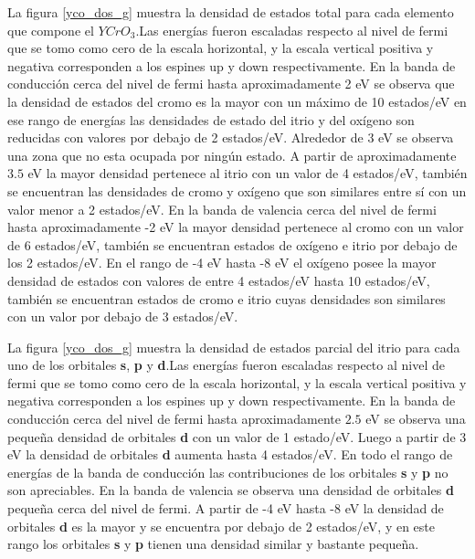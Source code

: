 La figura \ref{yco_dos_g}  muestra la densidad de estados 
total para 
cada 
elemento que compone el $YCrO_{3}$.Las energ\'ias fueron escaladas 
respecto al 
nivel de fermi que se tomo como cero de la escala horizontal, y la 
escala 
vertical positiva y negativa corresponden a los espines up y down 
respectivamente. En la banda de conducci\'on cerca del nivel de fermi 
hasta aproximadamente 2 eV se observa que la densidad de estados del 
cromo es la mayor con un m\'aximo de 10 estados/eV en ese rango de 
energ\'ias las densidades de estado del itrio y del ox\'igeno son 
reducidas con valores por debajo de 2 estados/eV. Alrededor de 3 eV se 
observa una zona que no esta ocupada por ning\'un estado. A partir de 
aproximadamente $3.5$ eV la mayor densidad pertenece al itrio con un 
valor de 4 estados/eV, tambi\'en se encuentran las densidades de cromo 
y ox\'igeno que son similares entre s\'i con un valor menor a 2 
estados/eV. En la banda de valencia cerca del nivel de fermi hasta 
aproximadamente -2 eV la mayor densidad pertenece al cromo con un 
valor de 6 estados/eV, tambi\'en se encuentran estados de ox\'igeno e 
itrio por debajo de los 2 estados/eV. En el rango de -4 eV hasta -8 eV 
el ox\'igeno posee la mayor densidad de estados con valores de entre 4 
estados/eV hasta 10 estados/eV, tambi\'en se encuentran estados de 
cromo e itrio cuyas densidades son similares con un valor por debajo 
de 3 estados/eV.


\noindent La figura \ref{yco_dos_g}  muestra la densidad de 
estados parcial del 
itrio para 
cada 
uno de los orbitales \textbf{s}, \textbf{p} y \textbf{d}.Las 
energ\'ias fueron escaladas 
respecto al 
nivel de fermi que se tomo como cero de la escala horizontal, y la 
escala 
vertical positiva y negativa corresponden a los espines up y down 
respectivamente. En la banda de conducci\'on cerca del nivel de fermi 
hasta aproximadamente $2.5$ eV se observa una peque\~na densidad de 
orbitales \textbf{d} con un valor de 1 estado/eV. Luego a partir de 3 
eV la densidad de orbitales \textbf{d} aumenta hasta 4 estados/eV. En 
todo el rango de energ\'ias de la banda de conducci\'on las 
contribuciones de los orbitales \textbf{s} y \textbf{p} no son 
apreciables. En la banda de valencia se observa una densidad de 
orbitales \textbf{d} peque\~na cerca del nivel de fermi. A partir de 
-4 eV hasta -8 eV la densidad de orbitales \textbf{d} es la mayor y  
se encuentra por debajo de 2 estados/eV, y en este rango los orbitales 
\textbf{s} y \textbf{p} tienen una densidad similar y bastante 
peque\~na.



